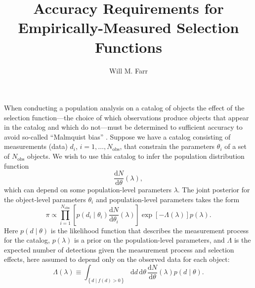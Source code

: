 \documentclass[modern]{aastex62}
\newcommand{\dd}{\mathrm{d}}
\newcommand{\diff}[2]{\frac{\dd #1}{\dd #2}}
\newcommand{\Nobs}{N_\mathrm{obs}}
\begin{document}
\title{Accuracy Requirements for Empirically-Measured Selection Functions}

\author[0000-0003-1540-8562]{Will M. Farr}

\maketitle

When conducting a population analysis on a catalog of objects the effect of the
selection function---the choice of which observations produce objects that
appear in the catalog and which do not---must be determined to sufficient
accuracy to avoid so-called ``Malmquist bias''
\citep{Malmquist1922,Loredo2004,Mandel2018}. Suppose we have a catalog
consisting of measurements (data) $d_i$, $i = 1, \ldots, \Nobs$, that constrain
the parameters $\theta_i$ of a set of $\Nobs$ objects.  We wish to use this
catalog to infer the population distribution function
%
\begin{equation}
  \diff{N}{\theta}\left( \lambda \right),
\end{equation}
%
which can depend on some population-level parameters $\lambda$.  The joint
posterior for the object-level parameters $\theta_i$ and population-level
parameters takes the form \citep{Loredo2004,Mandel2018}
%
\begin{equation}
  \label{eq:posterior}
\pi \propto \prod_{i=1}^{\Nobs} \left[ p\left( d_i \mid \theta_i \right) \diff{N}{\theta_i}\left( \lambda \right) \right] \exp\left[ - \Lambda\left( \lambda \right) \right] p\left( \lambda \right).
\end{equation}
%
Here $p\left( d \mid \theta\right)$ is the likelihood function that describes
the measurement process for the catalog, $p\left( \lambda \right)$ is a prior on
the population-level parameters, and $\Lambda$ is the expected number of
detections given the measurement process and selection effects, here assumed to
depend only on the observed data for each object:
%
\begin{equation}
  \label{eq:selection-integral-unnorm}
  \Lambda\left( \lambda \right) \equiv \int_{\left\{ d \mid f(d) > 0 \right\}} \dd d \, \dd \theta \, \diff{N}{\theta}\left( \lambda \right) p\left( d \mid \theta \right).
\end{equation}
\end{document}
